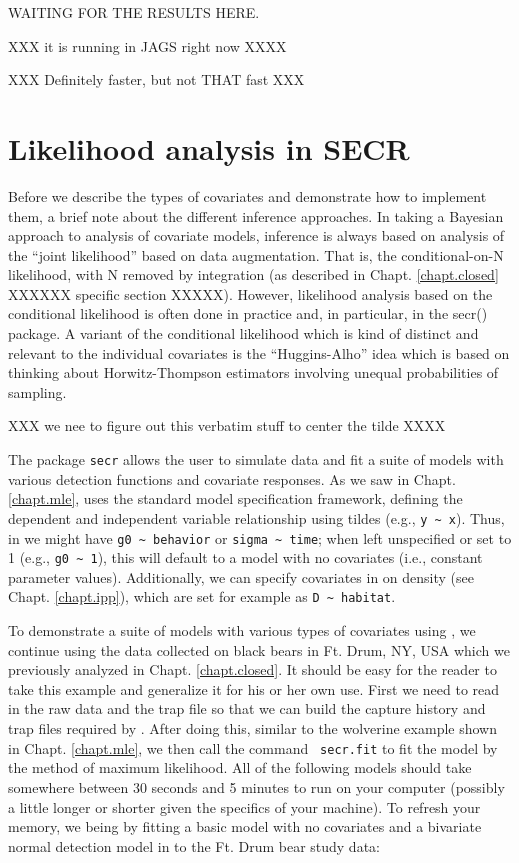 WAITING FOR THE RESULTS HERE.  

XXX it is running in JAGS right now XXXX

XXX Definitely faster, but not THAT fast XXX




\section{Likelihood analysis in SECR}

Before we describe the types of covariates and demonstrate how to
implement them, a brief note about the different inference approaches.
In taking a Bayesian approach to analysis of covariate models,
inference is always based on analysis of the ``joint likelihood''
based on data augmentation. That is, the conditional-on-N likelihood,
with N removed by integration (as described in
Chapt. \ref{chapt.closed} XXXXXX specific section XXXXX).
However, likelihood analysis
based on the conditional likelihood is often done in practice and, in
particular, in the secr() package.  A variant of the conditional
likelihood which is kind of distinct and relevant to the individual
covariates is the ``Huggins-Alho'' idea which is based on thinking
about Horwitz-Thompson estimators involving unequal probabilities of
sampling. 



XXX we nee to figure out this verbatim stuff to center the tilde XXXX

The package \mbox{\tt secr} allows the user to simulate data and fit a
suite of models with various detection functions and covariate
responses.  As we saw in Chapt. \ref{chapt.mle}, \secr uses the standard \R model
specification framework, defining the dependent and independent
variable relationship using tildes
(e.g., \Verb+y ~ x+).
Thus, in \secr we
might have \verb+g0 ~ behavior+ or \verb+sigma ~ time+; 
when left unspecified or set
to 1 (e.g., \verb+g0 ~ 1+), this will default to a model with no
covariates
(i.e., constant parameter values).
Additionally, we can specify covariates in \secr
on density (see Chapt. \ref{chapt.ipp}), 
which are set for example as \verb+D ~ habitat+.  

To demonstrate
a suite of models with various types of covariates using \secr, we
continue using the data collected on black bears in Ft. Drum, NY, USA
which we previously analyzed in Chapt. \ref{chapt.closed}.
It should be easy for the reader to take this example and generalize
it for his or her own use.  First we need to read in the raw data and
the trap file so that we can build the capture history and trap files
required by \secr.  After doing this, similar to the wolverine example
shown in Chapt. \ref{chapt.mle}, we then call the command \mbox{\tt
  secr.fit} 
to fit the model by the method of maximum likelihood.
 All of the following models should take somewhere between 30
seconds and 5 minutes to run on your computer (possibly a little
longer or shorter given the specifics of your machine).  To refresh
your memory, we being by fitting a basic 
model with no covariates and a bivariate normal detection model in
\secr to the Ft. Drum bear study data: 

